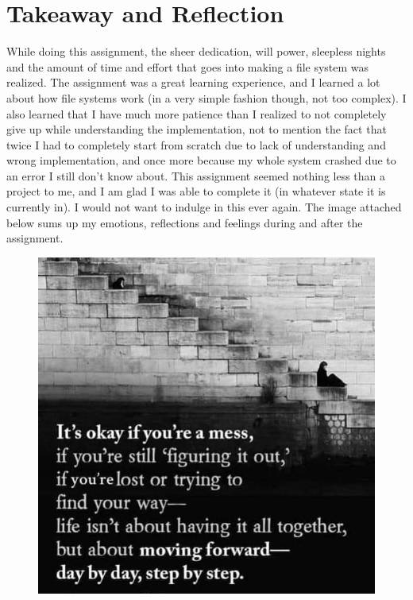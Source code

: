 \documentclass{article}
\theoremstyle{mytheoremstyle}
\theoremstyle{mytheoremstyle}
\theoremstyle{myproblemstyle}
\begin{document}
\newpage
\section{Takeaway and Reflection}
While doing this assignment, the sheer dedication, will power, sleepless nights and the amount of time and effort that goes into making a file system was realized. The assignment was a great learning experience, and I learned a lot about how file systems work (in a very simple fashion though, not too complex). I also learned that I have much more patience than I realized to not completely give up while understanding the implementation, not to mention the fact that twice I had to completely start from scratch due to lack of understanding and wrong implementation, and once more because my whole system crashed due to an error I still don't know about. This assignment seemed nothing less than a project to me, and I am glad I was able to complete it (in whatever state it is currently in). I would not want to indulge in this ever again. The image attached below sums up my emotions, reflections and feelings during and after the assignment.

\begin{figure}[htbp]
    \centering
    \includegraphics[width=\textwidth]{takeaway.jpg}
\end{figure}
\end{document}
